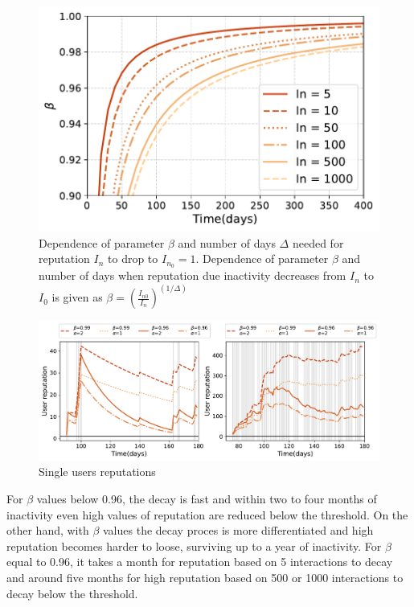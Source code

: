 \begin{figure}[h!]
	\centering
	\includegraphics[width=0.5\linewidth]{figures/stackexchange/reputation_decay.pdf}
	\caption{Dependence of parameter $\beta$ and number of days $\Delta$ needed for reputation $I_n$ to drop to $I_{n_0} = 1$. Dependence of parameter $\beta$ and number of days when reputation due inactivity decreases from $I_n$ to $I_0$ is given as  $\beta = (\frac{I_{n0}}{I_{n}})^{(1/\Delta)}$ }
	\label{fig:betadelta}
\end{figure}

\begin{figure}[h!]
	\centering
	\includegraphics[width=\linewidth]{figures/stackexchange/single_user_reputation.pdf}
	\caption{Single users reputations }
	\label{fig:singleuser}
\end{figure}

For $\beta$ values below 0.96, the decay is fast and within two to four months of inactivity even high values of reputation are reduced below the threshold. On the other hand, with $\beta$ values the decay proces is more differentiated and high reputation becomes harder to loose, surviving up to a year of inactivity. For $\beta$ equal to 0.96, it takes a month for reputation based on 5 interactions to decay and around five months for high reputation based on 500 or 1000 interactions to decay below the threshold.

